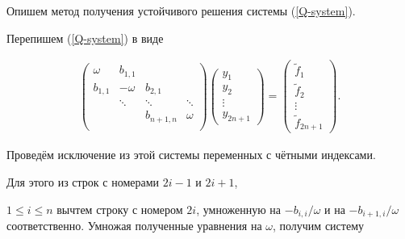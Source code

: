 Опишем метод получения устойчивого решения системы (\ref{Q-system}).

Перепишем (\ref{Q-system}) в виде

\begin{gather*}

\left(

\begin{array}{ccccccc}

{\omega} & b_{1,1} & & \\

b_{1,1} & {-\omega} & b_{2,1} & \\

& \ddots & \ddots & \ddots \\

& & b_{n+1, n} & {\omega} \\

\end{array}

\right) \left(

\begin{array}{c}

y_1 \\

y_2 \\

\vdots \\

y_{2n+1}

\end{array}

\right) = \left(

\begin{array}{c}

\widetilde{f}_1 \\

\widetilde{f}_2 \\

\vdots \\

\widetilde{f}_{2n+1}

\end{array}

\right).

\end{gather*}



Проведём исключение из этой системы переменных с чётными индексами.

Для этого из строк с номерами $2i-1$ и $2i+1$,

$1 \leqslant i \leqslant n$ вычтем строку с номером $2i$, умноженную на $-{b_{i,i}}/{\omega}$ и на $-{b_{i+1,i}}/{\omega}$ соответственно. Умножая полученные уравнения на $\omega$, получим систему


